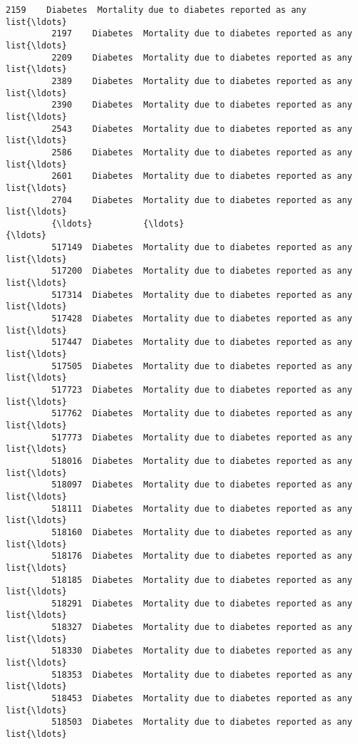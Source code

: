 \documentclass[11pt]{article}
\begin{document}
\begin{Verbatim}[commandchars=\\\{\}]
         2159    Diabetes  Mortality due to diabetes reported as any list{\ldots}   
         2197    Diabetes  Mortality due to diabetes reported as any list{\ldots}   
         2209    Diabetes  Mortality due to diabetes reported as any list{\ldots}   
         2389    Diabetes  Mortality due to diabetes reported as any list{\ldots}   
         2390    Diabetes  Mortality due to diabetes reported as any list{\ldots}   
         2543    Diabetes  Mortality due to diabetes reported as any list{\ldots}   
         2586    Diabetes  Mortality due to diabetes reported as any list{\ldots}   
         2601    Diabetes  Mortality due to diabetes reported as any list{\ldots}   
         2704    Diabetes  Mortality due to diabetes reported as any list{\ldots}   
         {\ldots}          {\ldots}                                                {\ldots}   
         517149  Diabetes  Mortality due to diabetes reported as any list{\ldots}   
         517200  Diabetes  Mortality due to diabetes reported as any list{\ldots}   
         517314  Diabetes  Mortality due to diabetes reported as any list{\ldots}   
         517428  Diabetes  Mortality due to diabetes reported as any list{\ldots}   
         517447  Diabetes  Mortality due to diabetes reported as any list{\ldots}   
         517505  Diabetes  Mortality due to diabetes reported as any list{\ldots}   
         517723  Diabetes  Mortality due to diabetes reported as any list{\ldots}   
         517762  Diabetes  Mortality due to diabetes reported as any list{\ldots}   
         517773  Diabetes  Mortality due to diabetes reported as any list{\ldots}   
         518016  Diabetes  Mortality due to diabetes reported as any list{\ldots}   
         518097  Diabetes  Mortality due to diabetes reported as any list{\ldots}   
         518111  Diabetes  Mortality due to diabetes reported as any list{\ldots}   
         518160  Diabetes  Mortality due to diabetes reported as any list{\ldots}   
         518176  Diabetes  Mortality due to diabetes reported as any list{\ldots}   
         518185  Diabetes  Mortality due to diabetes reported as any list{\ldots}   
         518291  Diabetes  Mortality due to diabetes reported as any list{\ldots}   
         518327  Diabetes  Mortality due to diabetes reported as any list{\ldots}   
         518330  Diabetes  Mortality due to diabetes reported as any list{\ldots}   
         518353  Diabetes  Mortality due to diabetes reported as any list{\ldots}   
         518453  Diabetes  Mortality due to diabetes reported as any list{\ldots}   
         518503  Diabetes  Mortality due to diabetes reported as any list{\ldots}   

\end{Verbatim}
\end{document}
